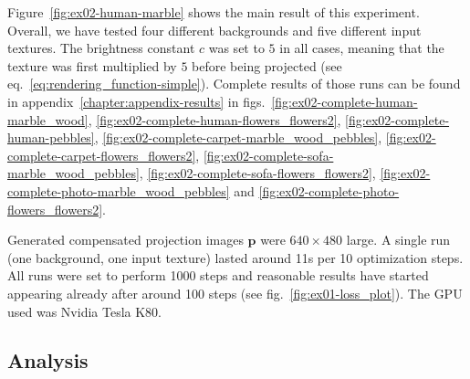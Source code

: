 Figure~\ref{fig:ex02-human-marble} shows the main result of this experiment. Overall, we have tested four different backgrounds and five different input textures. The brightness constant \(c\) was set to \(5\) in all cases, meaning that the texture was first multiplied by \(5\) before being projected (see eq.~\ref{eq:rendering_function-simple}). Complete results of those runs can be found in appendix~\ref{chapter:appendix-results} in figs.~\ref{fig:ex02-complete-human-marble_wood}, \ref{fig:ex02-complete-human-flowers_flowers2}, \ref{fig:ex02-complete-human-pebbles}, \ref{fig:ex02-complete-carpet-marble_wood_pebbles}, \ref{fig:ex02-complete-carpet-flowers_flowers2}, \ref{fig:ex02-complete-sofa-marble_wood_pebbles}, \ref{fig:ex02-complete-sofa-flowers_flowers2}, \ref{fig:ex02-complete-photo-marble_wood_pebbles} and \ref{fig:ex02-complete-photo-flowers_flowers2}.

Generated compensated projection images \(\bm{p}\) were \(640 \times 480\) large. A single run (one background, one input texture) lasted around 11s per 10 optimization steps. All runs were set to perform 1000 steps and reasonable results have started appearing already after around 100 steps (see fig.~\ref{fig:ex01-loss_plot}). The GPU used was Nvidia Tesla K80.

\subsection{Analysis}
\label{section:results-experiments-02-analysis}

